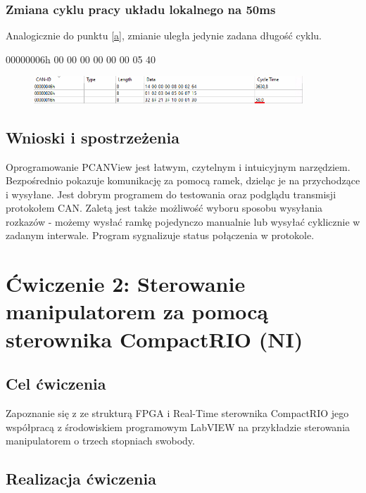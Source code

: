 \documentclass[margin = 2cm]{article}
\begin{document}
	\subsubsection{Zmiana cyklu pracy układu lokalnego na 50ms}
	Analogicznie do punktu \ref{a}, zmianie uległa jedynie zadana długość cyklu.
	
	00000006h	00 00 00 00 00 00 05 40
	\begin{figure}[H]
		\centering
		\includegraphics[width=0.9\textwidth]{50ms}
	\end{figure}
	\subsection{Wnioski i spostrzeżenia}
	Oprogramowanie PCANView jest łatwym, czytelnym i intuicyjnym narzędziem. Bezpośrednio pokazuje komunikację za pomocą ramek, dzieląc je na przychodzące i wysyłane. Jest dobrym programem do testowania oraz podglądu transmisji protokołem CAN. Zaletą jest także możliwość wyboru sposobu wysyłania rozkazów - możemy wysłać ramkę pojedynczo manualnie lub wysyłać cyklicznie w zadanym interwale. Program sygnalizuje status połączenia w protokole. 


\section{Ćwiczenie 2: Sterowanie manipulatorem za pomocą sterownika CompactRIO (NI)}
	\subsection{Cel ćwiczenia}
Zapoznanie się z ze strukturą FPGA i Real-Time sterownika CompactRIO jego współpracą z środowiskiem programowym LabVIEW na przykładzie sterowania manipulatorem o trzech stopniach swobody.
	\subsection{Realizacja ćwiczenia}
\end{document}
